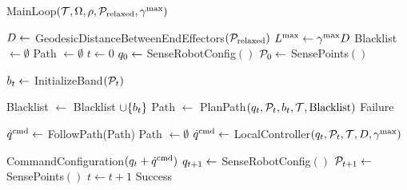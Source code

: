 \begin{algorithm}[t]
\caption{MainLoop$(\mathcal{T}, \Omega, \rho, \mathcal{P}_\textrm{relaxed}, \gamma^{\textrm{max}})$}
\begin{algorithmic}[1]
    \State $D \gets$ GeodesicDistanceBetweenEndEffectors$(\mathcal{P}_\textrm{relaxed})$
    \State $L^\textrm{max} \gets \gamma^{\textrm{max}} D$
    \State Blacklist $\gets \emptyset$
    \State Path $\gets \emptyset$
    \State $t \gets 0$
    \State $q_0 \gets$ SenseRobotConfig$()$
    \State $\mathcal{P}_0 \gets$ SensePoints$()$
    
        \State $b_t \gets$ InitializeBand$(\mathcal{P}_t)$
        
            \State Blacklist $\gets$ Blacklist $\cup \{ b_t \}$
            \State Path $\gets$ PlanPath$(q_t, \mathcal{P}_t, b_t, \mathcal{T}, \textrm{Blacklist})$
                \State \Return Failure
            \EndIf
        \EndIf
        
            \State $\dot{q}^{\textrm{cmd}} \gets$ FollowPath(Path)
                \State Path $\gets \emptyset$
            \EndIf
        \Else
            \State $\dot{q}^{\textrm{cmd}} \gets$ LocalController$(q_t, \mathcal{P}_t, \mathcal{T}, D, \gamma^{\textrm{max}})$
        \EndIf
        
        \State CommandConfiguration$(q_t + \dot{q}^{\textrm{cmd}})$
        \State $q_{t+1} \gets$ SenseRobotConfig$()$
        \State $\mathcal{P}_{t+1} \gets$ SensePoints$()$
        \State $t \gets t + 1$
    \EndWhile
    \State \Return Success
\end{algorithmic}
\label{alg:interleaving_mainloop}
\end{algorithm}

